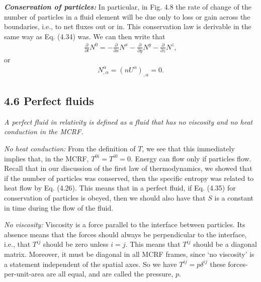 \documentclass[12pt]{book}
\begin{document}
    \textbf{\textit{Conservation of particles:}}
    In particular, in Fig. 4.8 the rate of change of the number of particles in a fluid element will be due only to loss or gain across the boundaries, i.e., to net fluxes out or in. This conservation law is derivable in the same way as Eq. (4.34) was. We can then write that
    \begin{align}
    \frac{\partial}{\partial t} N^0 = - \frac{\partial}{\partial x} N^x - \frac{\partial}{\partial y} N^y - \frac{\partial}{\partial z} N^z,
    \end{align}
    or
    \begin{align}
    N^{\alpha}_{,\alpha} = (n U^\alpha)_{,\alpha} = 0. \tag{4.35}
    \end{align}

    \subsection{4.6 Perfect fluids}

    \textit{A perfect fluid in relativity is defined as a fluid that has no viscosity and no heat conduction in the MCRF.}

    \textit{No heat conduction:} From the definition of \(T\), we see that this immediately implies that, in the MCRF, \(T^{0i} = T^{i0} = 0\). Energy can flow only if particles flow. Recall that in our discussion of the first law of thermodynamics, we showed that if the number of particles was conserved, then the specific entropy was related to heat flow by Eq. (4.26). This means that in a perfect fluid, if Eq. (4.35) for conservation of particles is obeyed, then we should also have that \(S\) is a constant in time during the flow of the fluid.

    \textit{No viscosity:} Viscosity is a force parallel to the interface between particles. Its absence means that the forces should always be perpendicular to the interface, i.e., that \(T^{ij}\) should be zero unless \(i = j\). This means that \(T^{ij}\) should be a diagonal matrix. Moreover, it must be diagonal in all MCRF frames, since ‘no viscosity’ is a statement independent of the spatial axes. So we have \(T^{ij} = p \delta^{ij}\) these forces-per-unit-area are all equal, and are called the pressure, \(p\).
\end{document}
